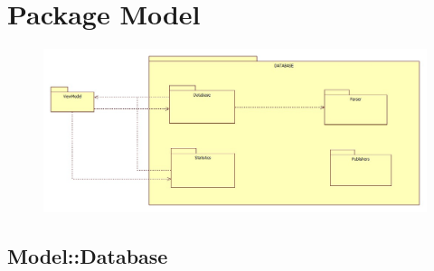 \section{Package Model}\begin{figure}[h!]
\begin{center}
	\includegraphics[scale=0.4]{../images/ModelPackage.jpg}
\end{center}
\end{figure}
\subsection{Model::Database}
